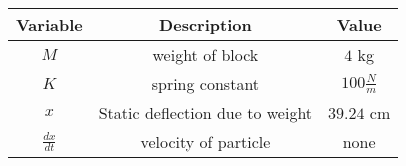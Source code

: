      \begin{tabular}{|c|c|c|} 
      \hline
\textbf{Variable}& \textbf{Description}& \textbf{Value}\\\hline
         $M$& weight of block &$4$ kg\\\hline
          $K$ & spring constant & $100\frac{N}{m}$  \\\hline
          $x$& Static deflection due to weight&$39.24$ cm\\\hline
            $\frac{dx}{dt}$& velocity of particle & none \\\hline
    \end{tabular}
